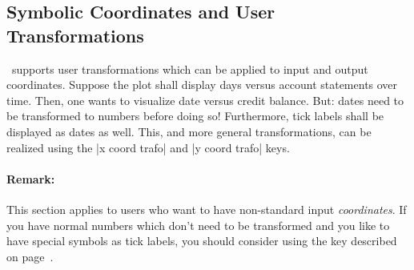 \subsection{Symbolic Coordinates and User Transformations}
\label{pgfplots:sec:symbolic:coords}
\PGFPlots\ supports user transformations which can be applied to input and output coordinates. Suppose the plot shall display days versus account statements over time. Then, one wants to visualize date versus credit balance. But: dates need to be transformed to numbers before doing so! Furthermore, tick labels shall be displayed as dates as well. This, and more general transformations, can be realized using the |x coord trafo| and |y coord trafo| keys.

\paragraph{Remark:} This section applies to users who want to have non-standard input \emph{coordinates}. If you have normal numbers which don't need to be transformed and you like to have special symbols as tick labels, you should consider using the  key described on page~\pageref{pgfplots:key:xticklabels}.

